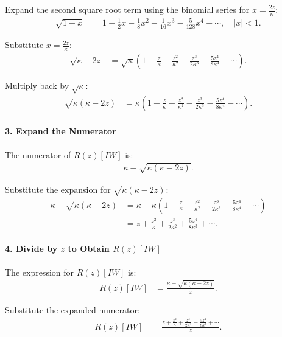 Expand the second square root term using the binomial series for $x = \frac{2z}{\kappa}$:
\begin{align}
\sqrt{1 - x} &= 1 - \frac{1}{2}x - \frac{1}{8}x^2 - \frac{1}{16}x^3 - \frac{5}{128}x^4 - \cdots, \quad |x| < 1.
\end{align}

Substitute \( x = \frac{2z}{\kappa} \):
\begin{align}
\sqrt{\kappa - 2z} &= \sqrt{\kappa} \left( 1 - \frac{z}{\kappa} - \frac{z^2}{\kappa^2} - \frac{z^3}{2\kappa^3} - \frac{5z^4}{8\kappa^4} - \cdots \right).
\end{align}

Multiply back by $\sqrt{\kappa}$:
\begin{align}
\sqrt{\kappa(\kappa - 2z)} &= \kappa \left( 1 - \frac{z}{\kappa} - \frac{z^2}{\kappa^2} - \frac{z^3}{2\kappa^3} - \frac{5z^4}{8\kappa^4} - \cdots \right).
\end{align}

\paragraph{3. Expand the Numerator}

The numerator of $R(z)[IW]$ is:
\begin{align}
\kappa - \sqrt{\kappa(\kappa - 2z)}.
\end{align}

Substitute the expansion for $\sqrt{\kappa(\kappa - 2z)}$:
\begin{align}
\kappa - \sqrt{\kappa(\kappa - 2z)} &= \kappa - \kappa \left( 1 - \frac{z}{\kappa} - \frac{z^2}{\kappa^2} - \frac{z^3}{2\kappa^3} - \frac{5z^4}{8\kappa^4} - \cdots \right) \\
&= z + \frac{z^2}{\kappa} + \frac{z^3}{2\kappa^2} + \frac{5z^4}{8\kappa^3} + \cdots.
\end{align}

\paragraph{4. Divide by $z$ to Obtain $R(z)[IW]$}

The expression for $R(z)[IW]$ is:
\begin{align}
R(z)[IW] &= \frac{\kappa - \sqrt{\kappa(\kappa - 2z)}}{z}.
\end{align}

Substitute the expanded numerator:
\begin{align}
R(z)[IW] &= \frac{z + \frac{z^2}{\kappa} + \frac{z^3}{2\kappa^2} + \frac{5z^4}{8\kappa^3} + \cdots}{z}.
\end{align}


